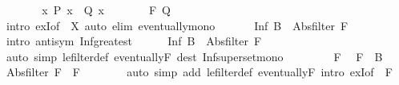 \begin{isabellebody}
\ \ \ \ \isamarkupfalse%
\ \isamarkupfalse%
\ {\isachardoublequoteopen}{\isasymforall}x{\isachardot}{\kern0pt}\ P\ x\ {\isasymlongrightarrow}\ Q\ x{\isachardoublequoteclose}\isanewline
\ \ \ \ \isamarkupfalse%
\ \isamarkupfalse%
\ {\isachardoublequoteopen}{\isacharquery}{\kern0pt}F\ Q{\isachardoublequoteclose}\isanewline
\ \ \ \ \ \ \isamarkupfalse%
\ {\isacharparenleft}{\kern0pt}intro\ exI{\isacharbrackleft}{\kern0pt}of\ {\isacharunderscore}{\kern0pt}\ X{\isacharbrackright}{\kern0pt}{\isacharparenright}{\kern0pt}\ {\isacharparenleft}{\kern0pt}auto\ elim{\isacharcolon}{\kern0pt}\ eventually{\isacharunderscore}{\kern0pt}mono{\isacharparenright}{\kern0pt}\isanewline
\ \ \isamarkupfalse%
\isanewline
\isanewline
\ \ \isamarkupfalse%
\ {\isachardoublequoteopen}Inf\ B\ {\isacharequal}{\kern0pt}\ Abs{\isacharunderscore}{\kern0pt}filter\ {\isacharquery}{\kern0pt}F{\isachardoublequoteclose}\isanewline
\ \ \isamarkupfalse%
\ {\isacharparenleft}{\kern0pt}intro\ antisym\ Inf{\isacharunderscore}{\kern0pt}greatest{\isacharparenright}{\kern0pt}\isanewline
\ \ \ \ \isamarkupfalse%
\ {\isachardoublequoteopen}Inf\ B\ {\isasymle}\ Abs{\isacharunderscore}{\kern0pt}filter\ {\isacharquery}{\kern0pt}F{\isachardoublequoteclose}\isanewline
\ \ \ \ \ \ \isamarkupfalse%
\ {\isacharparenleft}{\kern0pt}auto\ simp{\isacharcolon}{\kern0pt}\ le{\isacharunderscore}{\kern0pt}filter{\isacharunderscore}{\kern0pt}def\ eventually{\isacharunderscore}{\kern0pt}F\ dest{\isacharcolon}{\kern0pt}\ Inf{\isacharunderscore}{\kern0pt}superset{\isacharunderscore}{\kern0pt}mono{\isacharparenright}{\kern0pt}\isanewline
\ \ \isamarkupfalse%
\isanewline
\ \ \ \ \isamarkupfalse%
\ F\ \isamarkupfalse%
\ {\isachardoublequoteopen}F\ {\isasymin}\ B{\isachardoublequoteclose}\ \isamarkupfalse%
\ \isamarkupfalse%
\ {\isachardoublequoteopen}Abs{\isacharunderscore}{\kern0pt}filter\ {\isacharquery}{\kern0pt}F\ {\isasymle}\ F{\isachardoublequoteclose}\isanewline
\ \ \ \ \ \ \isamarkupfalse%
\ {\isacharparenleft}{\kern0pt}auto\ simp\ add{\isacharcolon}{\kern0pt}\ le{\isacharunderscore}{\kern0pt}filter{\isacharunderscore}{\kern0pt}def\ eventually{\isacharunderscore}{\kern0pt}F\ intro{\isacharbang}{\kern0pt}{\isacharcolon}{\kern0pt}\ exI{\isacharbrackleft}{\kern0pt}of\ {\isacharunderscore}{\kern0pt}\ {\isachardoublequoteopen}{\isacharbraceleft}{\kern0pt}F{\isacharbraceright}{\kern0pt}{\isachardoublequoteclose}{\isacharbrackright}{\kern0pt}{\isacharparenright}{\kern0pt}\isanewline

\end{isabellebody}
